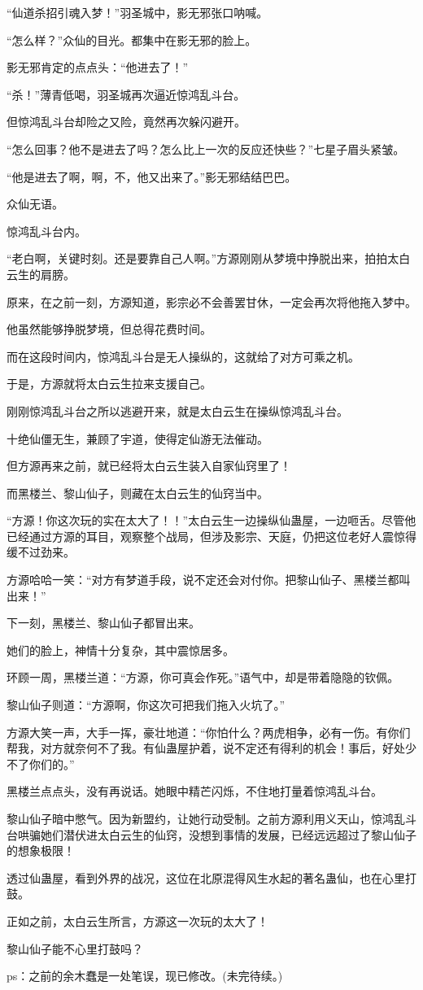 \begin{this_body}
“仙道杀招引魂入梦！”羽圣城中，影无邪张口呐喊。

“怎么样？”众仙的目光。都集中在影无邪的脸上。

影无邪肯定的点点头：“他进去了！”

“杀！”薄青低喝，羽圣城再次逼近惊鸿乱斗台。

但惊鸿乱斗台却险之又险，竟然再次躲闪避开。

“怎么回事？他不是进去了吗？怎么比上一次的反应还快些？”七星子眉头紧皱。

“他是进去了啊，啊，不，他又出来了。”影无邪结结巴巴。

众仙无语。

惊鸿乱斗台内。

“老白啊，关键时刻。还是要靠自己人啊。”方源刚刚从梦境中挣脱出来，拍拍太白云生的肩膀。

原来，在之前一刻，方源知道，影宗必不会善罢甘休，一定会再次将他拖入梦中。

他虽然能够挣脱梦境，但总得花费时间。

而在这段时间内，惊鸿乱斗台是无人操纵的，这就给了对方可乘之机。

于是，方源就将太白云生拉来支援自己。

刚刚惊鸿乱斗台之所以逃避开来，就是太白云生在操纵惊鸿乱斗台。

十绝仙僵无生，兼顾了宇道，使得定仙游无法催动。

但方源再来之前，就已经将太白云生装入自家仙窍里了！

而黑楼兰、黎山仙子，则藏在太白云生的仙窍当中。

“方源！你这次玩的实在太大了！！”太白云生一边操纵仙蛊屋，一边咂舌。尽管他已经通过方源的耳目，观察整个战局，但涉及影宗、天庭，仍把这位老好人震惊得缓不过劲来。

方源哈哈一笑：“对方有梦道手段，说不定还会对付你。把黎山仙子、黑楼兰都叫出来！”

下一刻，黑楼兰、黎山仙子都冒出来。

她们的脸上，神情十分复杂，其中震惊居多。

环顾一周，黑楼兰道：“方源，你可真会作死。”语气中，却是带着隐隐的钦佩。

黎山仙子则道：“方源啊，你这次可把我们拖入火坑了。”

方源大笑一声，大手一挥，豪壮地道：“你怕什么？两虎相争，必有一伤。有你们帮我，对方就奈何不了我。有仙蛊屋护着，说不定还有得利的机会！事后，好处少不了你们的。”

黑楼兰点点头，没有再说话。她眼中精芒闪烁，不住地打量着惊鸿乱斗台。

黎山仙子暗中憋气。因为新盟约，让她行动受制。之前方源利用义天山，惊鸿乱斗台哄骗她们潜伏进太白云生的仙窍，没想到事情的发展，已经远远超过了黎山仙子的想象极限！

透过仙蛊屋，看到外界的战况，这位在北原混得风生水起的著名蛊仙，也在心里打鼓。

正如之前，太白云生所言，方源这一次玩的太大了！

黎山仙子能不心里打鼓吗？

ps：之前的余木蠢是一处笔误，现已修改。(未完待续。)

\end{this_body}

